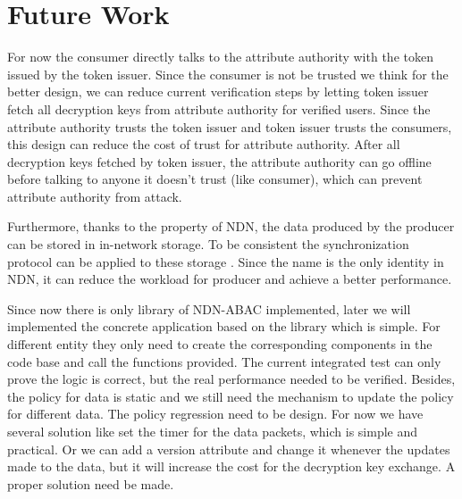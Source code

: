 \section{Future Work}

For now the consumer directly talks to the attribute authority with the token issued by the token issuer. Since the consumer is not be trusted we think for the better design, we can reduce current verification steps by letting token issuer fetch all decryption keys from attribute authority for verified users. Since the attribute authority trusts the token issuer and token issuer trusts the consumers, this design can reduce the cost of trust for attribute authority. After all decryption keys fetched by token issuer, the attribute authority can go offline before talking to anyone it doesn't trust (like consumer), which can prevent attribute authority from attack.

Furthermore, thanks to the property of NDN, the data produced by the producer can be stored in in-network storage. To be consistent the synchronization protocol can be applied to these storage \cite{zhu2013let}. Since the name is the only identity in NDN, it can reduce the workload for producer and achieve a better performance.

Since now there is only library of NDN-ABAC implemented, later we will implemented the concrete application based on the library which is simple. For different entity they only need to create the corresponding components in the code base and call the functions provided. The current integrated test can only prove the logic is correct, but the real performance needed to be verified. Besides, the policy for data is static and we still need the mechanism to update the policy for different data. The policy regression need to be design. For now we have several solution like set the timer for the data packets, which is simple and practical. Or we can add a version attribute and change it whenever the updates made to the data, but it will increase the cost for the decryption key exchange. A proper solution need be made.